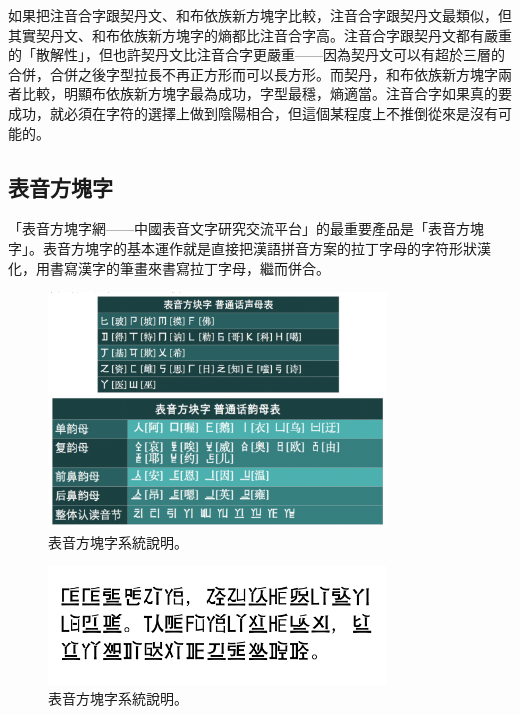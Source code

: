 \documentclass[a5paper, 12pt, openany]{book} %
\begin{document}
如果把注音合字跟契丹文、和布依族新方塊字比較，注音合字跟契丹文最類似，但其實契丹文、和布依族新方塊字的熵都比注音合字高。注音合字跟契丹文都有嚴重的「散解性」，但也許契丹文比注音合字更嚴重——因為契丹文可以有超於三層的合併，合併之後字型拉長不再正方形而可以長方形。而契丹，和布依族新方塊字兩者比較，明顯布依族新方塊字最為成功，字型最穩，熵適當。注音合字如果真的要成功，就必須在字符的選擇上做到陰陽相合，但這個某程度上不推倒從來是沒有可能的。

\subsection{表音方塊字}

「表音方塊字網——中國表音文字研究交流平台」的最重要產品是「表音方塊字」。表音方塊字的基本運作就是直接把漢語拼音方案的拉丁字母的字符形狀漢化，用書寫漢字的筆畫來書寫拉丁字母，繼而併合。


\begin{figure}[H]
  \centering
  \includegraphics[width=0.8\textwidth]{./images/biaoyinzi_1.png}
  \caption{表音方塊字系統說明。}
  \label{fig:biaoyinzi_1}
\end{figure}
  




\begin{figure}[H]
  \centering
  \includegraphics[width=0.8\textwidth]{./images/biaoyinzi_2.png}
  \caption{表音方塊字系統說明。}
  \label{fig:biaoyinzi_2}
\end{figure}
\end{document}
